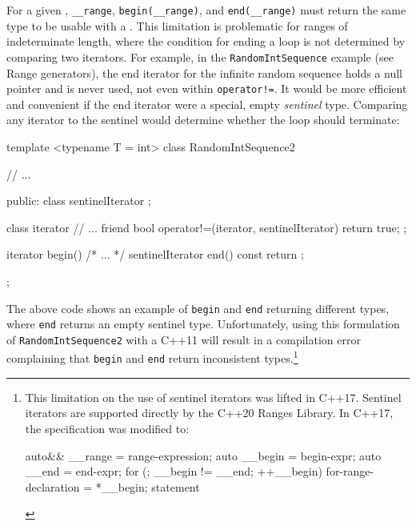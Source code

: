 {{{For a given , \lstinline!__range!,
\lstinline!begin(__range)!, and \lstinline!end(__range)! must return the
same type to be usable with a .
This limitation is problematic for ranges of indeterminate length, where
the condition for ending a loop is not determined by comparing two
iterators. For example, in the \lstinline!RandomIntSequence! example (see
{Range generators}), the end iterator for the infinite random sequence
holds a null pointer and is never used, not even within
\lstinline|operator!=|. It would be more efficient and convenient if the
end iterator were a special, empty \emph{sentinel} type. Comparing any
iterator to the sentinel would determine whether the loop should
terminate:

\begin{emcppslisting}
template <typename T = int>
class RandomIntSequence2
{
    // ...

public:
    class sentinelIterator { };

    class iterator {
        // ...
        friend bool operator!=(iterator, sentinelIterator) { return true; }
    };

    iterator         begin() { /* ... */ }
    sentinelIterator end() const { return {}; }
};
\end{emcppslisting}
    

\noindent The above code shows an example of \lstinline!begin! and \lstinline!end!
returning different types, where \lstinline!end! returns an empty sentinel
type. Unfortunately, using this formulation of
\lstinline!RandomIntSequence2!\linebreak[4]\newpage 
with a C++11  will result in a compilation error complaining that
\lstinline!begin! and \lstinline!end! return inconsistent
types.{\cprotect\footnote{This limitation on the use of sentinel
iterators was lifted in C++17. Sentinel iterators are supported
directly by the C++20 Ranges Library. In C++17, the specification was
modified to:

\begin{emcppslisting}[style=footcode,emcppsignore={grammar, not code, but leave as c++}]
{
    auto&& __range = range-expression;
    auto __begin   = begin-expr;
    auto __end     = end-expr;
    for (; __begin != __end; ++__begin)
    {
        for-range-declaration = *__begin;
        statement
    }
}
\end{emcppslisting}
      }}

}}}
